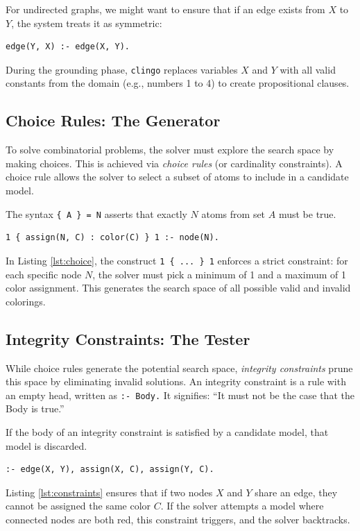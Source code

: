 For undirected graphs, we might want to ensure that if an edge exists from $X$ to $Y$, the system treats it as symmetric:
\begin{lstlisting}[caption={Deriving symmetric edges.}, label={lst:rules}]
% If there is an edge from X to Y, imply an edge from Y to X
edge(Y, X) :- edge(X, Y).
\end{lstlisting}
During the grounding phase, \texttt{clingo} replaces variables $X$ and $Y$ with all valid constants from the domain (e.g., numbers 1 to 4) to create propositional clauses.

\subsection{Choice Rules: The Generator}
To solve combinatorial problems, the solver must explore the search space by making choices. This is achieved via \textit{choice rules} (or cardinality constraints). A choice rule allows the solver to select a subset of atoms to include in a candidate model.

The syntax \texttt{\{ A \} = N} asserts that exactly $N$ atoms from set $A$ must be true.
\begin{lstlisting}[caption={Generating color assignments.}, label={lst:choice}]
% For every node N, choose exactly one color C from the defined colors.
1 { assign(N, C) : color(C) } 1 :- node(N).
\end{lstlisting}
In Listing \ref{lst:choice}, the construct \texttt{1 \{ ... \} 1} enforces a strict constraint: for each specific node $N$, the solver must pick a minimum of 1 and a maximum of 1 color assignment. This generates the search space of all possible valid and invalid colorings.

\subsection{Integrity Constraints: The Tester}
While choice rules generate the potential search space, \textit{integrity constraints} prune this space by eliminating invalid solutions. An integrity constraint is a rule with an empty head, written as \texttt{:- Body.} It signifies: ``It must not be the case that the Body is true.''

If the body of an integrity constraint is satisfied by a candidate model, that model is discarded.
\begin{lstlisting}[caption={Eliminating invalid graph colorings.}, label={lst:constraints}]
% It is strictly forbidden for two connected nodes to share a color.
:- edge(X, Y), assign(X, C), assign(Y, C).
\end{lstlisting}
Listing \ref{lst:constraints} ensures that if two nodes $X$ and $Y$ share an edge, they cannot be assigned the same color $C$. If the solver attempts a model where connected nodes are both red, this constraint triggers, and the solver backtracks.

